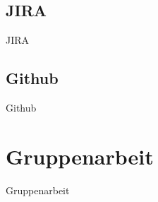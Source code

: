 \documentclass[19pt]{beamer}
\begin{document}
\subsection{JIRA}
\begin{frame}[allowframebreaks]{JIRA}
	\begin{figure}
		\begin{center}
		\end{center}
		\framebreak
		\begin{center}
		\end{center}
	\end{figure}				
\end{frame}

\subsection{Github}
\begin{frame}[allowframebreaks]{Github}
	\begin{figure}
		\begin{center}
		\end{center}
		\framebreak
		\begin{center}
		\end{center}
	\end{figure}				
\end{frame}

\section{Gruppenarbeit}
\begin{frame}{Gruppenarbeit}
	\begin{figure}
		\begin{center}
		\end{center}
	\end{figure}	
\end{frame}
\end{document}
